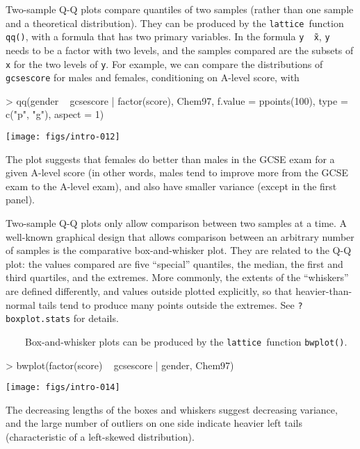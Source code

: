 \documentclass[10pt]{article}
\newcommand{\code}[1]{\texttt{#1}}
\newcommand{\lattice}{\code{lattice}}
\newcommand{\Rfunction}[1]{\code{#1()}}
\begin{document}
\newpage


Two-sample Q-Q plots compare quantiles of two samples (rather than one
sample and a theoretical distribution).  They can be produced by the
\lattice\ function \Rfunction{qq}, with a formula that has two primary
variables.  In the formula \code{y \~\ x}, \code{y} needs to be a
factor with two levels, and the samples compared are the subsets of
\code{x} for the two levels of \code{y}.  For example, we can compare
the distributions of \code{gcsescore} for males and females,
conditioning on A-level score, with
\begin{Schunk}
\begin{Sinput}
> qq(gender ~ gcsescore | factor(score), Chem97, 
     f.value = ppoints(100), type = c("p", "g"), aspect = 1)
\end{Sinput}
\end{Schunk}
\begin{center}
\texttt{[image: figs/intro-012]}
\end{center}
The plot suggests that females do better than males in the GCSE exam
for a given A-level score (in other words, males tend to improve more
from the GCSE exam to the A-level exam), and also have smaller
variance (except in the first panel).




\newpage

Two-sample Q-Q plots only allow comparison between two samples at a
time.  A well-known graphical design that allows comparison between an
arbitrary number of samples is the comparative box-and-whisker plot.
They are related to the Q-Q plot: the values compared are five
``special'' quantiles, the median, the first and third quartiles, and
the extremes.  More commonly, the extents of the ``whiskers'' are
defined differently, and values outside plotted explicitly, so that
heavier-than-normal tails tend to produce many points outside the
extremes.  See \code{?boxplot.stats} for details.


~~~~Box-and-whisker plots can be produced by the \lattice\ function
\Rfunction{bwplot}.  
\begin{Schunk}
\begin{Sinput}
> bwplot(factor(score) ~ gcsescore | gender, Chem97)
\end{Sinput}
\end{Schunk}
\begin{center}
\texttt{[image: figs/intro-014]}
\end{center}
The decreasing lengths of the boxes and whiskers suggest decreasing
variance, and the large number of outliers on one side indicate
heavier left tails (characteristic of a left-skewed distribution).
\end{document}
